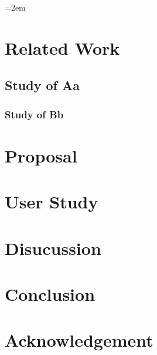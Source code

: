 \documentclass[a4paper]{report}
\begin{document}
\makecover

\addtolength{\textheight}{-5mm}
\setlength{\footskip}{15mm}	%

\justifying


\fontsize{11pt}{15pt}\selectfont

\tableofcontents
\listoffigures

\parindent=2em	%
\pagebreak\setcounter{page}{1}
\pagestyle{plain}




\chapter{Related Work}
\section{Study of Aa}
\subsection{Study of Bb}

\chapter{Proposal}

\chapter{User Study}

\chapter{Disucussion}

\chapter{Conclusion}

\chapter*{Acknowledgement}


\newpage
{}
\renewcommand{\bibname}{References}

%
%


\end{document}
